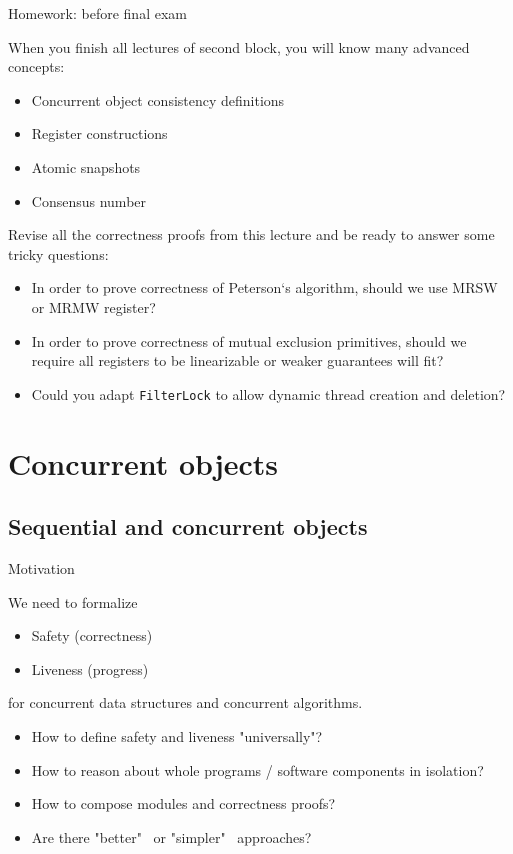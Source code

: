 \begin{frame}[fragile]{Homework: before final exam}

When you finish all lectures of second block, you will know many advanced concepts:
\begin{itemize}
  \item Concurrent object consistency definitions
  \item Register constructions
  \item Atomic snapshots
  \item Consensus number
\end{itemize}

Revise all the correctness proofs from this lecture and be ready to answer some tricky questions:
\begin{itemize}
  \item In order to prove correctness of Peterson`s algorithm, should we use MRSW or MRMW register?
  \item In order to prove correctness of mutual exclusion primitives, should we require all registers to be linearizable or weaker guarantees will fit?
  \item Could you adapt \texttt{FilterLock} to allow dynamic thread creation and deletion?
\end{itemize}

\end{frame}


\section{Concurrent objects}
\showTOC

\subsection{Sequential and concurrent objects}

\begin{frame}{Motivation}

We need to formalize
\begin{itemize}
  \item Safety (correctness)
  \item Liveness (progress)
\end{itemize}

\pause

for concurrent data structures and concurrent algorithms.

\pause
\begin{itemize}
  \item How to define safety and liveness "universally"?
  \item How to reason about whole programs / software components in isolation?
  \item How to compose modules and correctness proofs?
  \item Are there "better" \ or "simpler" \ approaches?
\end{itemize}
\end{frame}



